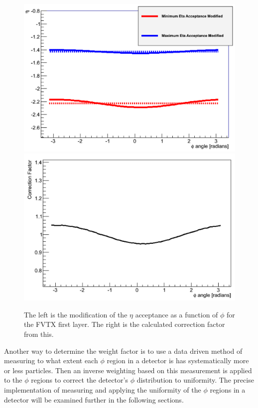 \begin{figure}[h!]
\begin{center}
\includegraphics[width=0.47\linewidth]{figs/eta_modification.png}
\includegraphics[width=0.47\linewidth]{figs/analytic_correction.png}
\caption{The left is the modification of the $\eta$ acceptance as a function of $\phi$ for the FVTX first layer. The right is the calculated correction factor from this.}
\label{fig:analytic_corr}
\end{center}
\end{figure}

Another way to determine the weight factor is to use a data driven method of measuring to what extent each $\phi$ region in a detector is has systematically more or less particles. Then an inverse weighting based on this measurement is applied to the $\phi$ regions to correct the detector's $\phi$ distribution to uniformity. The precise implementation of measuring and applying the uniformity of the $\phi$ regions in a detector will be examined further in the following sections.

